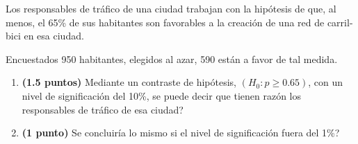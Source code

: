 
Los responsables de tráfico de una ciudad trabajan con la hipótesis de que, al menos, el 65\% de sus habitantes son favorables a la creación de una red de carril-bici en esa ciudad.

Encuestados 950 habitantes, elegidos al azar, 590 están a favor de tal medida.
\begin{enumerate}[label=\alph*)]
\item \textbf{(1.5 puntos)} Mediante un contraste de hipótesis, $(H_0:p\geq0.65)$, con un nivel de significación del 10\%, \textquestiondown{}se puede decir que tienen razón los responsables de tráfico de esa ciudad?
\item \textbf{(1 punto)} \textquestiondown{}Se concluiría lo mismo si el nivel de significación fuera del 1\%?
\end{enumerate}
